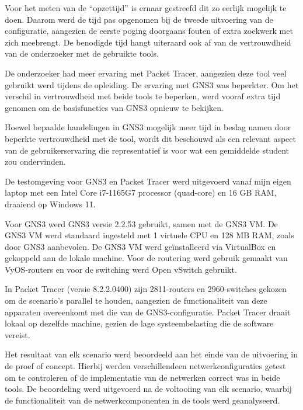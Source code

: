 Voor het meten van de ``opzettijd'' is ernaar gestreefd dit zo eerlijk mogelijk te doen. Daarom werd de tijd pas opgenomen bij de tweede uitvoering van de configuratie, aangezien de eerste poging doorgaans fouten of extra zoekwerk met zich meebrengt. De benodigde tijd hangt uiteraard ook af van de vertrouwdheid van de onderzoeker met de gebruikte tools.

\vspace{0.5cm}

De onderzoeker had meer ervaring met Packet Tracer, aangezien deze tool veel gebruikt werd tijdens de opleiding. De ervaring met GNS3 was beperkter. Om het verschil in vertrouwdheid met beide tools te beperken, werd vooraf extra tijd genomen om de basisfuncties van GNS3 opnieuw te bekijken.

\vspace{0.5cm}

Hoewel bepaalde handelingen in GNS3 mogelijk meer tijd in beslag namen door beperkte vertrouwdheid met de tool, wordt dit beschouwd als een relevant aspect van de gebruikerservaring die representatief is voor wat een gemiddelde student zou ondervinden.

\vspace{0.5cm}

De testomgeving voor GNS3 en Packet Tracer werd uitgevoerd vanaf mijn eigen laptop met een Intel Core i7-1165G7 processor (quad-core) en 16 GB RAM, draaiend op Windows 11.

\vspace{0.3cm}

Voor GNS3 werd GNS3 versie 2.2.53 gebruikt, samen met de GNS3 VM. De GNS3 VM werd standaard ingesteld met 1 virtuele CPU en 128 MB RAM, zoals door GNS3 aanbevolen. De GNS3 VM werd geïnstalleerd via VirtualBox en gekoppeld aan de lokale machine. Voor de routering werd gebruik gemaakt van VyOS-routers en voor de switching werd Open vSwitch gebruikt.

\vspace{0.3cm}

In Packet Tracer (versie 8.2.2.0400) zijn 2811-routers en 2960-switches gekozen om de scenario's parallel te houden, aangezien de functionaliteit van deze apparaten overeenkomt met die van de GNS3-configuratie. Packet Tracer draait lokaal op dezelfde machine, gezien de lage systeembelasting die de software vereist.

\vspace{0.3cm}

Het resultaat van elk scenario werd beoordeeld aan het einde van de uitvoering in de proef of concept. Hierbij werden verschillendeen  netwerkconfiguraties getest om te controleren of de implementatie van de netwerken correct was in beide tools. De beoordeling werd uitgevoerd na de voltooiing van elk scenario, waarbij de functionaliteit van de netwerkcomponenten in de tools werd geanalyseerd.





